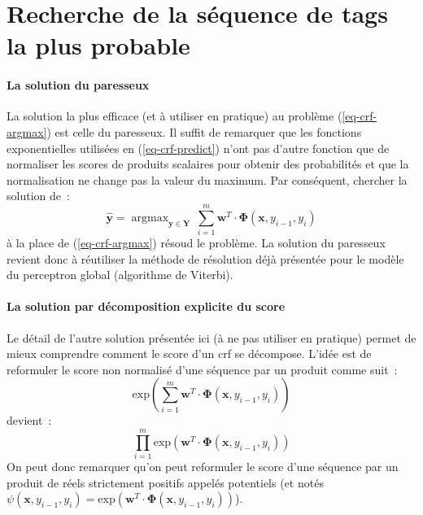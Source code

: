 \documentclass[11pt,openany]{book}
\newcommand{\ac}[1]{{\sc #1}} %
\begin{document}
\section{Recherche de la séquence de tags la plus probable}

\paragraph{La solution du paresseux}
La solution la plus efficace (et à utiliser en pratique) au problème (\ref{eq-crf-argmax}) est celle du paresseux.  Il suffit de remarquer que les fonctions exponentielles utilisées en (\ref{eq-crf-predict})  n'ont pas d'autre fonction que de normaliser les scores de produits scalaires pour obtenir des probabilités et que la normalisation
ne change pas la valeur du maximum. Par conséquent, chercher la solution de~:
\begin{equation}
\hat{\mathbf{y}} =  \mathop{\text{argmax}}_{\mathbf{y}\in \mathbf{Y}}
\, \sum_{i=1}^m \mathbf{w}^T \cdot \boldsymbol\Phi(\mathbf{x},y_{i-1},y_i)
\end{equation}
à la place de (\ref{eq-crf-argmax}) résoud le problème. La solution du paresseux revient donc à réutiliser la méthode de résolution déjà présentée pour le modèle du perceptron global (algorithme de Viterbi). 

\paragraph{La solution par décomposition explicite du score}
Le détail de l'autre solution présentée ici (à ne pas utiliser en pratique) permet de mieux comprendre comment le score d'un \ac{crf} se décompose.
L'idée est de reformuler le score non normalisé d'une séquence par un produit comme suit~: 
\begin{displaymath}
\text{exp}\left(\sum_{i=1}^m \mathbf{w}^T \cdot \boldsymbol\Phi(\mathbf{x},y_{i-1},y_i)\right)
\end{displaymath}
devient~:
\begin{displaymath}
\prod_{i=1}^m \text{exp}\left(\mathbf{w}^T \cdot \boldsymbol\Phi(\mathbf{x},y_{i-1},y_i)\right)
\end{displaymath}
On peut donc remarquer qu'on peut reformuler le score d'une séquence
par un produit de réels strictement positifs appelés potentiels (et
notés $\psi(\mathbf{x},y_{i-1},y_i) = \text{exp}\left(\mathbf{w}^T \cdot \boldsymbol\Phi(\mathbf{x},y_{i-1},y_i)\right)$). 

\end{document}
